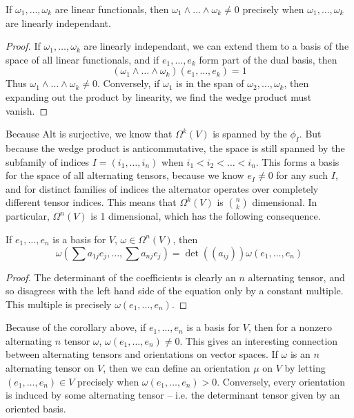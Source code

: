 \begin{corollary}
    If $\omega_1, \dots, \omega_k$ are linear functionals, then $\omega_1 \wedge \dots \wedge \omega_k \neq 0$ precisely when $\omega_1, \dots, \omega_k$ are linearly independant.
\end{corollary}
\begin{proof}
    If $\omega_1, \dots, \omega_k$ are linearly independant, we can extend them to a basis of the space of all linear functionals, and if $e_1, \dots, e_k$ form part of the dual basis, then
    \[ (\omega_1 \wedge \dots \wedge \omega_k)(e_1, \dots, e_k) = 1 \]
    Thus $\omega_1 \wedge \dots \wedge \omega_k \neq 0$. Conversely, if $\omega_1$ is in the span of $\omega_2, \dots, \omega_k$, then expanding out the product by linearity, we find the wedge product must vanish.
\end{proof}

Because $\text{Alt}$ is surjective, we know that $\Omega^k(V)$ is spanned by the $\phi_I$. But because the wedge product is anticommutative, the space is still spanned by the subfamily of indices $I = (i_1, \dots, i_n)$ when $i_1 < i_2 < \dots < i_n$. This forms a basis for the space of all alternating tensors, because we know $e_I \neq 0$ for any such $I$, and for distinct families of indices the alternator operates over completely different tensor indices. This means that $\Omega^k(V)$ is ${n \choose k}$ dimensional. In particular, $\Omega^n(V)$ is 1 dimensional, which has the following consequence.

\begin{corollary}
    If $e_1, \dots, e_n$ is a basis for $V$, $\omega \in \Omega^n(V)$, then
    \[ \omega \left(\sum a_{1j} e_j, \dots, \sum a_{nj} e_j \right) = \det((a_{ij})) \omega(e_1, \dots, e_n) \]
\end{corollary}
\begin{proof}
    The determinant of the coefficients is clearly an $n$ alternating tensor, and so disagrees with the left hand side of the equation only by a constant multiple. This multiple is precisely $\omega(e_1, \dots, e_n)$.
\end{proof}

Because of the corollary above, if $e_1, \dots, e_n$ is a basis for $V$, then for a nonzero alternating $n$ tensor $\omega$, $\omega(e_1, \dots, e_n) \neq 0$. This gives an interesting connection between alternating tensors and orientations on vector spaces. If $\omega$ is an $n$ alternating tensor on $V$, then we can define an orientation $\mu$ on $V$ by letting $(e_1, \dots, e_n) \in V$ precisely when $\omega(e_1, \dots, e_n) > 0$. Conversely, every orientation is induced by some alternating tensor -- i.e. the determinant tensor given by an oriented basis.

